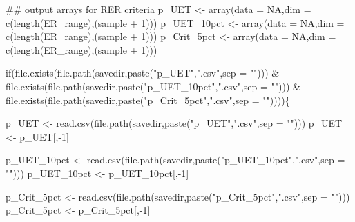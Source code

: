 \documentclass[
  11pt,
]{article}
\newenvironment{Shaded}{}{}
\newcommand{\CommentTok}[1]{\textcolor[rgb]{0.00,0.50,0.00}{#1}}
\newcommand{\ControlFlowTok}[1]{\textcolor[rgb]{0.00,0.00,1.00}{#1}}
\newcommand{\DataTypeTok}[1]{#1}
\newcommand{\DecValTok}[1]{#1}
\newcommand{\KeywordTok}[1]{\textcolor[rgb]{0.00,0.00,1.00}{#1}}
\newcommand{\NormalTok}[1]{#1}
\newcommand{\OperatorTok}[1]{#1}
\newcommand{\OtherTok}[1]{\textcolor[rgb]{1.00,0.25,0.00}{#1}}
\newcommand{\StringTok}[1]{\textcolor[rgb]{0.00,0.50,0.50}{#1}}
\begin{document}
\begin{Shaded}
\begin{Highlighting}[]
\CommentTok{## output arrays for RER criteria}
\NormalTok{p_UET <-}\StringTok{ }\KeywordTok{array}\NormalTok{(}\DataTypeTok{data =} \OtherTok{NA}\NormalTok{,}\DataTypeTok{dim =} \KeywordTok{c}\NormalTok{(}\KeywordTok{length}\NormalTok{(ER_range),(sample }\OperatorTok{+}\StringTok{ }\DecValTok{1}\NormalTok{)))}
\NormalTok{p_UET_10pct <-}\StringTok{ }\KeywordTok{array}\NormalTok{(}\DataTypeTok{data =} \OtherTok{NA}\NormalTok{,}\DataTypeTok{dim =} \KeywordTok{c}\NormalTok{(}\KeywordTok{length}\NormalTok{(ER_range),(sample }\OperatorTok{+}\StringTok{ }\DecValTok{1}\NormalTok{)))}
\NormalTok{p_Crit_5pct <-}\StringTok{ }\KeywordTok{array}\NormalTok{(}\DataTypeTok{data =} \OtherTok{NA}\NormalTok{,}\DataTypeTok{dim =} \KeywordTok{c}\NormalTok{(}\KeywordTok{length}\NormalTok{(ER_range),(sample }\OperatorTok{+}\StringTok{ }\DecValTok{1}\NormalTok{)))}



\ControlFlowTok{if}\NormalTok{(}\KeywordTok{file.exists}\NormalTok{(}\KeywordTok{file.path}\NormalTok{(savedir,}\KeywordTok{paste}\NormalTok{(}\StringTok{"p_UET"}\NormalTok{,}\StringTok{".csv"}\NormalTok{,}\DataTypeTok{sep =} \StringTok{""}\NormalTok{))) }\OperatorTok{&}
\StringTok{   }\KeywordTok{file.exists}\NormalTok{(}\KeywordTok{file.path}\NormalTok{(savedir,}\KeywordTok{paste}\NormalTok{(}\StringTok{"p_UET_10pct"}\NormalTok{,}\StringTok{".csv"}\NormalTok{,}\DataTypeTok{sep =} \StringTok{""}\NormalTok{))) }\OperatorTok{&}
\StringTok{   }\KeywordTok{file.exists}\NormalTok{(}\KeywordTok{file.path}\NormalTok{(savedir,}\KeywordTok{paste}\NormalTok{(}\StringTok{"p_Crit_5pct"}\NormalTok{,}\StringTok{".csv"}\NormalTok{,}\DataTypeTok{sep =} \StringTok{""}\NormalTok{))))\{}
  
\NormalTok{  p_UET <-}\StringTok{ }\KeywordTok{read.csv}\NormalTok{(}\KeywordTok{file.path}\NormalTok{(savedir,}\KeywordTok{paste}\NormalTok{(}\StringTok{"p_UET"}\NormalTok{,}\StringTok{".csv"}\NormalTok{,}\DataTypeTok{sep =} \StringTok{""}\NormalTok{)))}
\NormalTok{  p_UET <-}\StringTok{ }\NormalTok{p_UET[,}\OperatorTok{-}\DecValTok{1}\NormalTok{]}
  
\NormalTok{  p_UET_10pct <-}\StringTok{ }\KeywordTok{read.csv}\NormalTok{(}\KeywordTok{file.path}\NormalTok{(savedir,}\KeywordTok{paste}\NormalTok{(}\StringTok{"p_UET_10pct"}\NormalTok{,}\StringTok{".csv"}\NormalTok{,}\DataTypeTok{sep =} \StringTok{""}\NormalTok{)))}
\NormalTok{  p_UET_10pct <-}\StringTok{ }\NormalTok{p_UET_10pct[,}\OperatorTok{-}\DecValTok{1}\NormalTok{]}
  
\NormalTok{  p_Crit_5pct <-}\StringTok{ }\KeywordTok{read.csv}\NormalTok{(}\KeywordTok{file.path}\NormalTok{(savedir,}\KeywordTok{paste}\NormalTok{(}\StringTok{"p_Crit_5pct"}\NormalTok{,}\StringTok{".csv"}\NormalTok{,}\DataTypeTok{sep =} \StringTok{""}\NormalTok{)))}
\NormalTok{  p_Crit_5pct <-}\StringTok{ }\NormalTok{p_Crit_5pct[,}\OperatorTok{-}\DecValTok{1}\NormalTok{]}
  

\end{Highlighting}
\end{Shaded}
\end{document}
